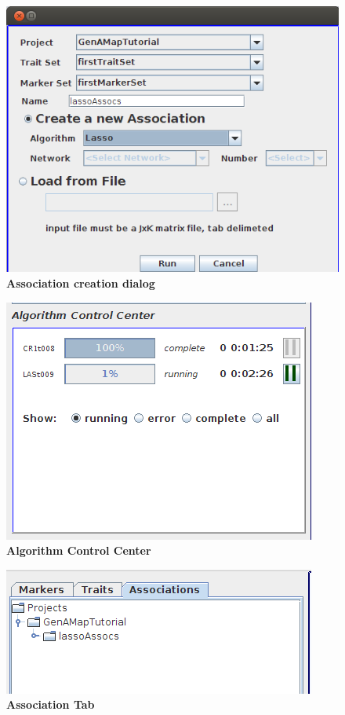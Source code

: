 \documentclass{article}
\begin{document}
\begin{figure}
\includegraphics[width=\textwidth]{assocCreation.png}
\caption{\textbf{Association creation dialog}}
\label{assocCreation}
\end{figure}

\begin{figure}
\includegraphics[width=\textwidth]{controlCenter.png}
\caption{\textbf{Algorithm Control Center}}
\label{controlCenter}
\end{figure}

\begin{figure}
\includegraphics[width=\textwidth]{assocTab.png}
\caption{\textbf{Association Tab}}
\label{assocTab}
\end{figure}
\end{document}
